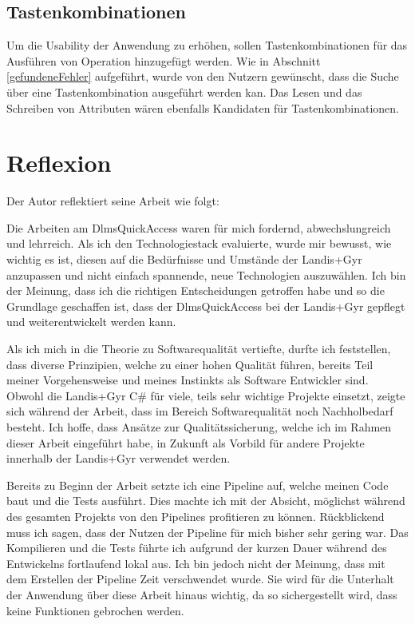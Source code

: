 \subsection{Tastenkombinationen}
Um die Usability der Anwendung zu erhöhen, sollen Tastenkombinationen für das Ausführen von Operation hinzugefügt werden.
Wie in Abschnitt \ref{gefundeneFehler} aufgeführt, wurde von den Nutzern gewünscht, dass die Suche über eine Tastenkombination ausgeführt werden kan.
Das Lesen und das Schreiben von Attributen wären ebenfalls Kandidaten für Tastenkombinationen.


\section{Reflexion}

Der Autor reflektiert seine Arbeit wie folgt:

\dq
Die Arbeiten am DlmsQuickAccess waren für mich fordernd, abwechslungreich und lehrreich.
Als ich den Technologiestack evaluierte, wurde mir bewusst, wie wichtig es ist, diesen auf die Bedürfnisse und Umstände der Landis+Gyr anzupassen und nicht einfach spannende, neue Technologien auszuwählen.
Ich bin der Meinung, dass ich die richtigen Entscheidungen getroffen habe und so die Grundlage geschaffen ist, dass der DlmsQuickAccess bei der Landis+Gyr gepflegt und weiterentwickelt werden kann.

Als ich mich in die Theorie zu Softwarequalität vertiefte, durfte ich feststellen, dass diverse Prinzipien, welche zu einer hohen Qualität führen, bereits Teil meiner Vorgehensweise und meines Instinkts als Software Entwickler sind.
Obwohl die Landis+Gyr C\# für viele, teils sehr wichtige Projekte einsetzt, zeigte sich während der Arbeit, dass im Bereich Softwarequalität noch Nachholbedarf besteht.
Ich hoffe, dass Ansätze zur Qualitätssicherung, welche ich im Rahmen dieser Arbeit eingeführt habe, in Zukunft als Vorbild für andere Projekte innerhalb der Landis+Gyr verwendet werden.

Bereits zu Beginn der Arbeit setzte ich eine Pipeline auf, welche meinen Code baut und die Tests ausführt.
Dies machte ich mit der Absicht, möglichst während des gesamten Projekts von den Pipelines profitieren zu können.
Rückblickend muss ich sagen, dass der Nutzen der Pipeline für mich bisher sehr gering war.
Das Kompilieren und die Tests führte ich aufgrund der kurzen Dauer während des Entwickelns fortlaufend lokal aus.
Ich bin jedoch nicht der Meinung, dass mit dem Erstellen der Pipeline Zeit verschwendet wurde.
Sie wird für die Unterhalt der Anwendung über diese Arbeit hinaus wichtig, da so sichergestellt wird, dass keine Funktionen gebrochen werden.

